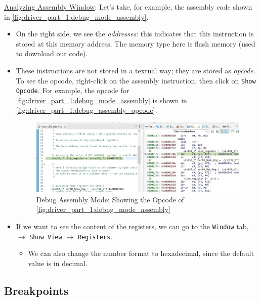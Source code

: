 \underline{Analyzing Assembly Window}: Let's take, for example, the assembly code shown in \autoref{fig:driver_part_1:debug_mode_assembly}.

\begin{itemize}
    \item On the right side, we see the \textit{addresses}: this indicates that this instruction is stored at this memory address. The memory type here is flash memory (used to download our code).

    \item These instructions are not stored in a textual way; they are stored as \textit{opcode}. To see the opcode, right-click on the assembly instruction, then click on \verb|Show Opcode|. For example, the opcode for 
    \autoref{fig:driver_part_1:debug_mode_assembly} is shown in 
    \autoref{fig:driver_part_1:debug_assembly_opcode}.

\newpage
\begin{figure}[h]
\centering
\includegraphics[scale=0.5]{Figures/driver_part_1/debug_assembly_opcode}
\caption{Debug Assembly Mode: Showing the Opcode of \autoref{fig:driver_part_1:debug_mode_assembly}}
\label{fig:driver_part_1:debug_assembly_opcode}
\end{figure}

    \item If we want to see the content of the registers, we can go to the \verb|Window| tab, $\rightarrow$ \verb|Show View|  $\rightarrow$ \verb|Registers|.

    \begin{itemize}
        \item We can also change the number format to hexadecimal, since the default value is in decimal.
    \end{itemize}
    
\end{itemize}

\subsection{Breakpoints}

